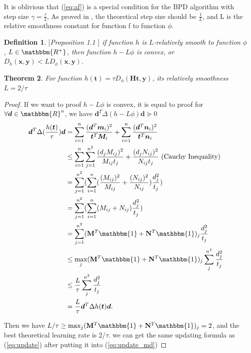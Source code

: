 \documentclass[conference]{IEEEtran}
\newtheorem{thm}{Theorem}
\newtheorem{definition}[thm]{Definition}
\newcommand{\mat}[1]{\mathbf{#1}}
\renewcommand{\vec}[1]{\bm{#1}}
\begin{document}
It is oblivious that (\ref{eq:af}) is a special condition for the BPD algorithm with step size $\gamma = \frac{\tau}{2}$,
As proved in \cite{bauschke2017descent}, the theoretical step size should be $\frac{1}{L}$, and L is the relative smoothness constant for function f to function $\phi$.
\begin{definition}$[$Proposition 1.1 \cite{doi:10.1137/16M1099546}$]$
if function $h$ is $L$-relatively smooth to function $\phi$, $L\in {\mathbbm{R^{+}}}$, then function $h-L\phi$ is convex, or $D_h(\vec x,\vec y)<LD_{\phi}(\vec x,\vec y)$.
\end{definition}


\begin{thm}
For function $h(\vec t) = \tau D_{\phi}(\mat H \vec t, \vec y)$, its relatively smoothness $L = 2/\tau$
\end{thm}
\begin{proof}
If we want to proof $h-L\phi$ is convex, it is equal to proof for $\forall \vec d\in{\mathbbm{R}^n}$, we have $\vec d^{T}\Delta (h-L\phi) \vec d\succeq 0$
\begin{align*}
\vec d^{T}\Delta (\frac{h(\vec t)}{\tau})\vec d &= \sum_{i=1}^{n}{\frac{(\vec d^{T}\vec {m}_i)^2}{\vec t^{T}\vec M_i}}+\sum_{i=1}^{n}{\frac{(\vec d^{T}\vec n_i)^2}{\vec t^{T}\vec n_i}}\\
&\leq \sum_{i=1}^{n}\sum_{j=1}^{n^2}{\frac{(d_j M_{ij})^2}{ M_{ij}t_j}+\frac{(d_j N_{ij})^2}{ N_{ij}t_j}}\text{ (Cauchy Inequality)}\\
&=\sum_{j=1}^{n^2}(\sum_{i=1}^{n}(\frac{( M_{ij})^2}{ M_{ij}}+\frac{( N_{ij})^2}{ N_{ij}})\frac{d_{j}^{2}}{t_j})\\
&=\sum_{j=1}^{n^2}(\sum_{i=1}^{n}({ M_{ij}}+{ N_{ij}})\frac{d_{j}^{2}}{t_j})\\
&=\sum_{j=1}^{n^2}({\mat M^{T}\mathbbm{1}}+{\mat N^{T}\mathbbm{1}})_{j}\frac{d_{j}^{2}}{t_j}\\
&\leq \max_{j} ({\mat M^{T}\mathbbm{1}}+{\mat N^{T}\mathbbm{1}})_{j} \sum_{j}^{n^2}\frac{d_{j}^{2}}{t_j}\\
&\leq \frac{L}{\tau} \sum_{j}^{n^2}\frac{d_{j}^{2}}{t_j}\\
&= \frac{L}{\tau} \vec d^{T}\Delta h(\vec t)\vec d.
\end{align*}

Then we have $L/\tau \geq \max_{j} ({\mat M^{T}\mathbbm{1}}+{\mat N^{T}\mathbbm{1}})_{j} = 2$, and the best theoretical learning rate is 2/$\tau$. we can get the same updating formula as (\ref{eq:update}) after putting it into (\ref{eq:update_md})
\end{proof}
\end{document}
